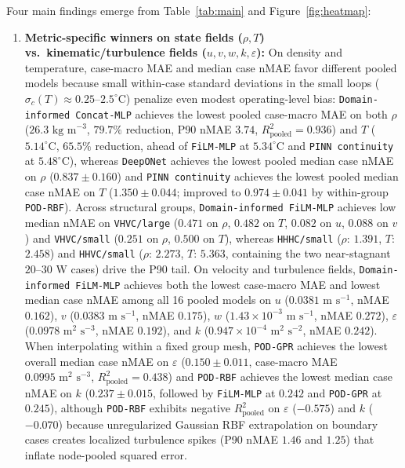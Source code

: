 \documentclass[11pt]{article}
\begin{document}
Four main findings emerge from Table~\ref{tab:main} and Figure~\ref{fig:heatmap}:
\begin{enumerate}
  \item \textbf{Metric-specific winners on state fields ($\rho, T$) vs.\ kinematic/turbulence fields ($u, v, w, k, \varepsilon$):} On density and temperature, case-macro MAE and median case nMAE favor different pooled models because small within-case standard deviations in the small loops ($\sigma_c(T) \approx 0.25\text{--}2.5^\circ\text{C}$) penalize even modest operating-level bias: \texttt{Domain-informed Concat-MLP} achieves the lowest pooled case-macro MAE on both $\rho$ ($26.3\text{ kg m}^{-3}$, $79.7\%$ reduction, P90 nMAE $3.74$, $R^2_{\mathrm{pooled}}=0.936$) and $T$ ($5.14^\circ\text{C}$, $65.5\%$ reduction, ahead of \texttt{FiLM-MLP} at $5.34^\circ\text{C}$ and \texttt{PINN continuity} at $5.48^\circ\text{C}$), whereas \texttt{DeepONet} achieves the lowest pooled median case nMAE on $\rho$ ($0.837 \pm 0.160$) and \texttt{PINN continuity} achieves the lowest pooled median case nMAE on $T$ ($1.350 \pm 0.044$; improved to $0.974 \pm 0.041$ by within-group \texttt{POD-RBF}). Across structural groups, \texttt{Domain-informed FiLM-MLP} achieves low median nMAE on \texttt{VHVC/large} ($0.471$ on $\rho$, $0.482$ on $T$, $0.082$ on $u$, $0.088$ on $v$) and \texttt{VHVC/small} ($0.251$ on $\rho$, $0.500$ on $T$), whereas \texttt{HHHC/small} ($\rho$: $1.391$, $T$: $2.458$) and \texttt{HHVC/small} ($\rho$: $2.273$, $T$: $5.363$, containing the two near-stagnant $20\text{--}30\text{ W}$ cases) drive the P90 tail. On velocity and turbulence fields, \texttt{Domain-informed FiLM-MLP} achieves both the lowest case-macro MAE and lowest median case nMAE among all 16 pooled models on $u$ ($0.0381\text{ m s}^{-1}$, nMAE $0.162$), $v$ ($0.0383\text{ m s}^{-1}$, nMAE $0.175$), $w$ ($1.43\times 10^{-3}\text{ m s}^{-1}$, nMAE $0.272$), $\varepsilon$ ($0.0978\text{ m}^2\text{ s}^{-3}$, nMAE $0.192$), and $k$ ($0.947\times 10^{-4}\text{ m}^2\text{ s}^{-2}$, nMAE $0.242$). When interpolating within a fixed group mesh, \texttt{POD-GPR} achieves the lowest overall median case nMAE on $\varepsilon$ ($0.150 \pm 0.011$, case-macro MAE $0.0995\text{ m}^2\text{ s}^{-3}$, $R^2_{\mathrm{pooled}}=0.438$) and \texttt{POD-RBF} achieves the lowest median case nMAE on $k$ ($0.237 \pm 0.015$, followed by \texttt{FiLM-MLP} at $0.242$ and \texttt{POD-GPR} at $0.245$), although \texttt{POD-RBF} exhibits negative $R^2_{\mathrm{pooled}}$ on $\varepsilon$ ($-0.575$) and $k$ ($-0.070$) because unregularized Gaussian RBF extrapolation on boundary cases creates localized turbulence spikes (P90 nMAE $1.46$ and $1.25$) that inflate node-pooled squared error.

\end{enumerate}
\end{document}
